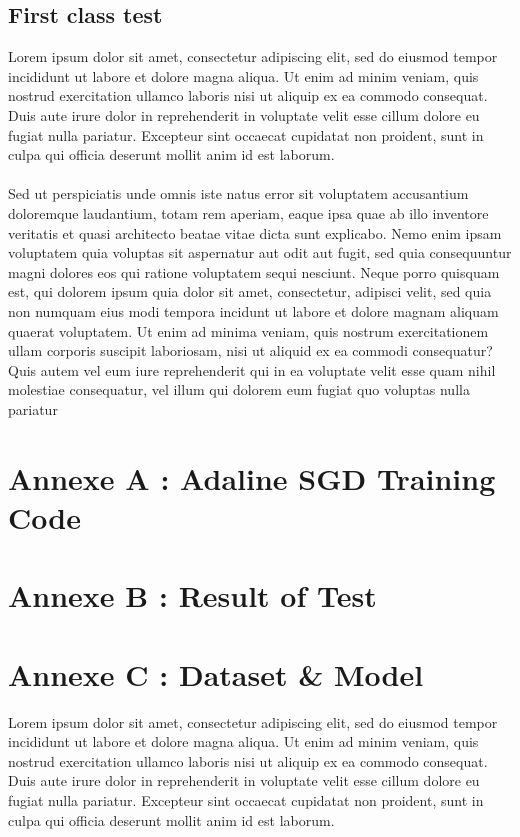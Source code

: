 \documentclass[12pt,a4paper,twoside]{report}
\begin{document}
		\section{First class test}
			Lorem ipsum dolor sit amet, consectetur adipiscing elit, sed do eiusmod tempor incididunt ut labore et dolore magna aliqua. Ut enim ad minim veniam, quis nostrud exercitation ullamco laboris nisi ut aliquip ex ea commodo consequat. Duis aute irure dolor in reprehenderit in voluptate velit esse cillum dolore eu fugiat nulla pariatur. Excepteur sint occaecat cupidatat non proident, sunt in culpa qui officia deserunt mollit anim id est laborum. 
			\\ \\
			Sed ut perspiciatis unde omnis iste natus error sit voluptatem accusantium doloremque laudantium, totam rem aperiam, eaque ipsa quae ab illo inventore veritatis et quasi architecto beatae vitae dicta sunt explicabo. Nemo enim ipsam voluptatem quia voluptas sit aspernatur aut odit aut fugit, sed quia consequuntur magni dolores eos qui ratione voluptatem sequi nesciunt. Neque porro quisquam est, qui dolorem ipsum quia dolor sit amet, consectetur, adipisci velit, sed quia non numquam eius modi tempora incidunt ut labore et dolore magnam aliquam quaerat voluptatem. Ut enim ad minima veniam, quis nostrum exercitationem ullam corporis suscipit laboriosam, nisi ut aliquid ex ea commodi consequatur? Quis autem vel eum iure reprehenderit qui in ea voluptate velit esse quam nihil molestiae consequatur, vel illum qui dolorem eum fugiat quo voluptas nulla pariatur
	
	\chapter*{Annexe A : Adaline SGD Training Code}
	\chapter*{Annexe B : Result of Test}
	\chapter*{Annexe C : Dataset \& Model}
		Lorem ipsum dolor sit amet, consectetur adipiscing elit, sed do eiusmod tempor incididunt ut labore et dolore magna aliqua. Ut enim ad minim veniam, quis nostrud exercitation ullamco laboris nisi ut aliquip ex ea commodo consequat. Duis aute irure dolor in reprehenderit in voluptate velit esse cillum dolore eu fugiat nulla pariatur. Excepteur sint occaecat cupidatat non proident, sunt in culpa qui officia deserunt mollit anim id est laborum.
	
	
	
	
	\nocite{*}
	
	
	
	
\end{document}

